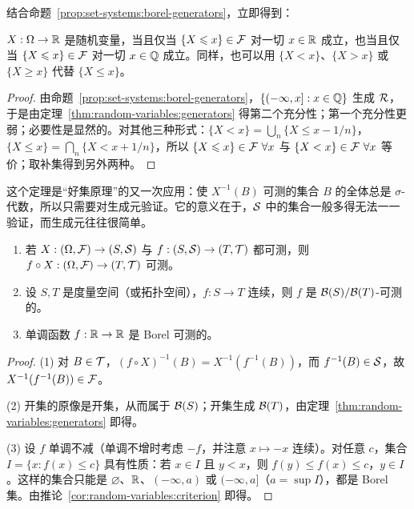 结合命题~\ref{prop:set-systems:borel-generators}，立即得到：

\begin{corollary}\label{cor:random-variables:criterion}
$X:\Omega\to\mathbb{R}$ 是随机变量，当且仅当 $\{X\leqslant x\}\in\mathcal{F}$ 对一切 $x\in\mathbb{R}$ 成立，也当且仅当 $\{X\leqslant x\}\in\mathcal{F}$ 对一切 $x\in\mathbb{Q}$ 成立。同样，也可以用 $\{X<x\}$、$\{X>x\}$ 或 $\{X\geqslant x\}$ 代替 $\{X\leqslant x\}$。
\end{corollary}
\begin{proof}
由命题~\ref{prop:set-systems:borel-generators}，$\{(-\infty,x]:x\in\mathbb{Q}\}$ 生成 $\mathcal{R}$，于是由定理~\ref{thm:random-variables:generators} 得第二个充分性；第一个充分性更弱；必要性是显然的。对其他三种形式：$\{X<x\}=\bigcup_n\{X\leqslant x-1/n\}$，$\{X\leqslant x\}=\bigcap_n\{X<x+1/n\}$，所以 $\{X\leqslant x\}\in\mathcal{F}\ \forall x$ 与 $\{X<x\}\in\mathcal{F}\ \forall x$ 等价；取补集得到另外两种。
\end{proof}

这个定理是“好集原理”的又一次应用：使 $X^{-1}(B)$ 可测的集合 $B$ 的全体总是 $\sigma$-代数，所以只需要对生成元验证。它的意义在于，$\mathcal{S}$ 中的集合一般多得无法一一验证，而生成元往往很简单。

\begin{theorem}[复合与连续映射]\label{thm:random-variables:composition}
\begin{enumerate}
\item 若 $X:(\Omega,\mathcal{F})\to(S,\mathcal{S})$ 与 $f:(S,\mathcal{S})\to(T,\mathcal{T})$ 都可测，则 $f\circ X:(\Omega,\mathcal{F})\to(T,\mathcal{T})$ 可测。
\item 设 $S,T$ 是度量空间（或拓扑空间），$f:S\to T$ 连续，则 $f$ 是 $\mathcal{B}(S)/\mathcal{B}(T)$-可测的。
\item 单调函数 $f:\mathbb{R}\to\mathbb{R}$ 是 Borel 可测的。
\end{enumerate}
\end{theorem}
\begin{proof}
(1) 对 $B\in\mathcal{T}$，$(f\circ X)^{-1}(B)=X^{-1}(f^{-1}(B))$，而 $f^{-1}(B)\in\mathcal{S}$，故 $X^{-1}(f^{-1}(B))\in\mathcal{F}$。

(2) 开集的原像是开集，从而属于 $\mathcal{B}(S)$；开集生成 $\mathcal{B}(T)$，由定理~\ref{thm:random-variables:generators} 即得。

(3) 设 $f$ 单调不减（单调不增时考虑 $-f$，并注意 $x\mapsto-x$ 连续）。对任意 $c$，集合 $I=\{x:f(x)\leqslant c\}$ 具有性质：若 $x\in I$ 且 $y<x$，则 $f(y)\leqslant f(x)\leqslant c$，$y\in I$。这样的集合只能是 $\varnothing$、$\mathbb{R}$、$(-\infty,a)$ 或 $(-\infty,a]$（$a=\sup I$），都是 Borel 集。由推论~\ref{cor:random-variables:criterion} 即得。
\end{proof}


